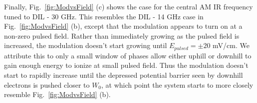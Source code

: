 \documentclass[aps,pra,preprint,groupedaddress]{revtex4-1}
\begin{document}
Finally, Fig.~\ref{fig:ModvsField} (c) shows the case for the central AM IR frequency tuned to DIL - 30 GHz. This resembles the DIL - 14 GHz case in Fig.~\ref{fig:ModvsField} (b), except that the modulation appears to turn on at a non-zero pulsed field. Rather than immediately growing as the pulsed field is increased, the modulation doesn't start growing until $E_{pulsed} = \pm 20$ mV/cm. We attribute this to only a small window of phases allow either uphill or downhill to gain enough energy to ionize at small pulsed field. Thus the modulation doesn't start to rapidly increase until the depressed potential barrier seen by downhill electrons is pushed closer to $W_0$, at which point the system starts to more closely resemble Fig.~\ref{fig:ModvsField} (b).

%
%
%
\end{document}

